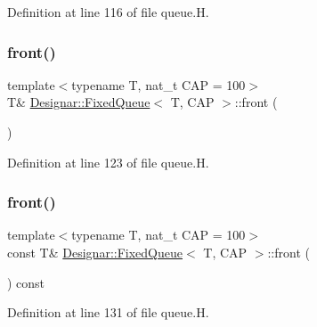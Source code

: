 Definition at line 116 of file queue.\+H.

\mbox{\label{class_designar_1_1_fixed_queue_a2440b268443093f6ff306e956d7f0616}} 
\subsubsection{\texorpdfstring{front()}{front()}\hspace{0.1cm}{\footnotesize\ttfamily [1/2]}}
{\footnotesize\ttfamily template$<$typename T, nat\+\_\+t C\+AP = 100$>$ \\
T\& \hyperlink{class_designar_1_1_fixed_queue}{Designar\+::\+Fixed\+Queue}$<$ T, C\+AP $>$\+::front (\begin{DoxyParamCaption}{ }\end{DoxyParamCaption})\hspace{0.3cm}{\ttfamily [inline]}}



Definition at line 123 of file queue.\+H.

\mbox{\label{class_designar_1_1_fixed_queue_ab86601d018b664a2f0d522bca18ee107}} 
\subsubsection{\texorpdfstring{front()}{front()}\hspace{0.1cm}{\footnotesize\ttfamily [2/2]}}
{\footnotesize\ttfamily template$<$typename T, nat\+\_\+t C\+AP = 100$>$ \\
const T\& \hyperlink{class_designar_1_1_fixed_queue}{Designar\+::\+Fixed\+Queue}$<$ T, C\+AP $>$\+::front (\begin{DoxyParamCaption}{ }\end{DoxyParamCaption}) const\hspace{0.3cm}{\ttfamily [inline]}}



Definition at line 131 of file queue.\+H.

\mbox{\label{class_designar_1_1_fixed_queue_aefa2e40721df2aff9ba56a2ef1f9db62}} 
